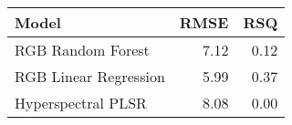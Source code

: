 \begin{longtable}{lrr}
\toprule
Model & RMSE & RSQ \\ 
\midrule
RGB Random Forest & 7.12 & 0.12 \\ 
RGB Linear Regression & 5.99 & 0.37 \\ 
Hyperspectral PLSR & 8.08 & 0.00 \\ 
\bottomrule
\end{longtable}

